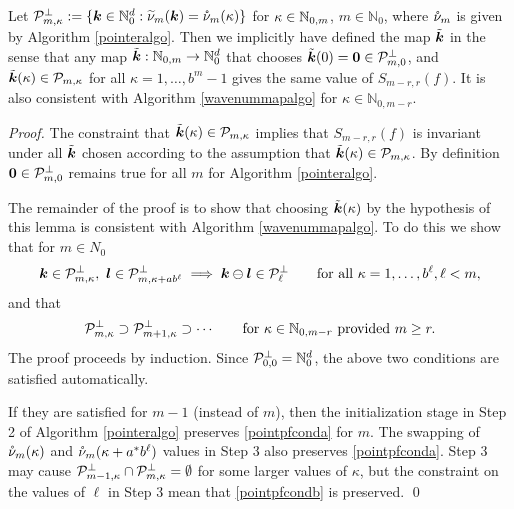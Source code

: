 \documentclass[graybox,footinfo]{svmult}
\newcommand{\N}{\mathbb{N}} %
\newcommand{\bszero}{\boldsymbol{0}} %
\begin{document}
\begin{lemma}  Let $\cp_{m,\kappa}^{\perp}:=\{\bsk \in \N_0^d : \tnu_m(\bsk)=\rnu_m(\kappa)\}$ for $\kappa \in \natm$, $m \in \N_0$, where $\mathring{\nu}_m$ is given by  Algorithm \ref{pointeralgo}.  Then we implicitly have defined the map $\tilde{\boldsymbol{k}}$ in the sense that any map $\tvk: \N_{0,m} \to \N_0^d$ that chooses $\tvk(0) = \bszero \in \cp_{m,0}^{\perp}$, and  $\tilde{\boldsymbol{k}}(\kappa) \in \mathcal{P}_{m,\kappa}$ for all $\kappa=1, \ldots, b^{m}-1$ gives the same value of $S_{m-r,r}(f)$.  It is also consistent with Algorithm \ref{wavenummapalgo} for $\kappa \in \N_{0,m-r}$.
\end{lemma}
\begin{proof}  The constraint that $\tilde{\boldsymbol{k}}(\kappa) \in \mathcal{P}_{m,\kappa}$ implies that $S_{m-r,r}(f)$ is invariant under all $\tilde{\boldsymbol{k}}$ chosen according to the assumption that $\tilde{\boldsymbol{k}}(\kappa) \in \mathcal{P}_{m,\kappa}$. By definition $\bszero \in \cp_{m,0}^{\perp}$ remains true for all $m$ for Algorithm \ref{pointeralgo}.

The remainder of the proof is to show that choosing $\tilde{\boldsymbol{k}}(\kappa)$ by the hypothesis of this lemma is consistent with Algorithm \ref{wavenummapalgo}. To do this we show that for $m \in N_0$
\begin{equation}
\bsk \in \cp_{m,\kappa}^\perp,\ \bsl \in \cp_{m,\kappa + a b^{\ell}}^\perp \implies \bsk \ominus \bsl \in \cp_{\ell}^{\perp} \qquad \text{for all } \kappa=1, \ldots, b^{\ell}, \ell < m,
\label{pointpfconda}
\end{equation}
and that 
\begin{equation}
\cp_{m,\kappa}^\perp \supset \cp_{m+1,\kappa}^\perp \supset \cdots \qquad \text{for } \kappa \in \N_{0,m-r} \text{ provided }m \ge r. \label{pointpfcondb}
\end{equation}
The proof proceeds by induction.  Since $\cp_{0,0}^{\perp}=\N_0^d$, the above two conditions are satisfied automatically.

If they are satisfied for $m-1$ (instead of $m$), then the initialization stage in Step 2 of Algorithm \ref{pointeralgo} preserves \eqref{pointpfconda} for $m$.  The swapping of $\mathring{\nu}_m(\kappa)$ and $\mathring{\nu}_m(\kappa+a^* b^{\ell})$ values in Step 3 also preserves \eqref{pointpfconda}.  Step 3 may cause $\mathcal{P}_{m-1,\kappa}^\perp \cap \mathcal{P}_{m,\kappa}^\perp = \emptyset$ for some larger values of $\kappa$, but the constraint on the values of $\ell$ in Step 3 mean that \eqref{pointpfcondb} is preserved.
\qed
\end{proof}
\end{document}
